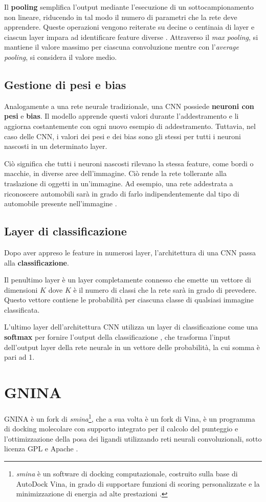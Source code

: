 Il \textbf{pooling} semplifica l’output mediante l’esecuzione di un sottocampionamento non lineare, riducendo in tal modo il numero di parametri che la rete deve apprendere.
Queste operazioni vengono reiterate su decine o centinaia di layer e ciascun layer impara ad identificare feature diverse \cite{mathworks_cnn}.
Attraverso il \textit{max pooling}, si mantiene il valore massimo per ciascuna convoluzione mentre con l'\textit{average pooling}, si considera il valore medio.

\subsection{Gestione di pesi e bias}
Analogamente a una rete neurale tradizionale, una CNN possiede \textbf{neuroni con pesi} e \textbf{bias}. Il modello apprende questi valori durante l’addestramento e li aggiorna costantemente con ogni nuovo esempio di addestramento. Tuttavia, nel caso delle CNN, i valori dei pesi e dei bias sono gli stessi per tutti i neuroni nascosti in un determinato layer.

Ciò significa che tutti i neuroni nascosti rilevano la stessa feature, come bordi o macchie, in diverse aree dell’immagine. Ciò rende la rete tollerante alla traslazione di oggetti in un’immagine. Ad esempio, una rete addestrata a riconoscere automobili sarà in grado di farlo indipendentemente dal tipo di automobile presente nell’immagine \cite{mathworks_cnn}.

\subsection{Layer di classificazione}
Dopo aver appreso le feature in numerosi layer, l’architettura di una CNN passa alla \textbf{classificazione}.

Il penultimo layer è un layer completamente connesso che emette un vettore di dimensioni \(K\) dove \(K\) è il numero di classi che la rete sarà in grado di prevedere. Questo vettore contiene le probabilità per ciascuna classe di qualsiasi immagine classificata.

L’ultimo layer dell’architettura CNN utilizza un layer di classificazione come una \textbf{softmax} per fornire l’output della classificazione \cite{mathworks_cnn}, che trasforma l'input dell'output layer della rete neurale in un vettore delle probabilità, la cui somma è pari ad 1.


\section{GNINA}
GNINA è un fork di \textit{smina}\footnote{\textit{smina} è un software di docking computazionale, costruito sulla base di AutoDock Vina, in grado di supportare funzioni di scoring personalizzate e la minimizzazione di energia ad alte prestazioni \cite{koes_lessons_2013}.}, che a sua volta è un fork di Vina, è un programma di docking molecolare con supporto integrato per il calcolo del punteggio e l'ottimizzazione della posa dei ligandi utilizzando reti neurali convoluzionali, sotto licenza GPL e Apache \cite{mcnutt_gnina_2021}. 

